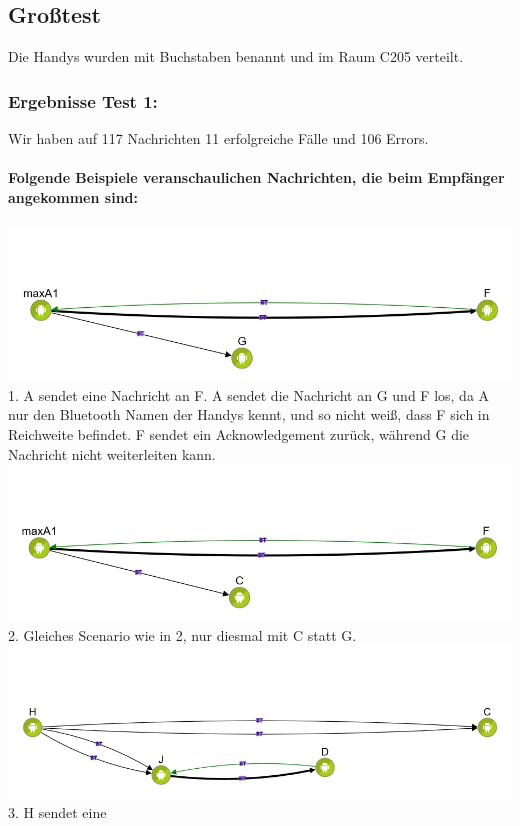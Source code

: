 \clearpage\subsection{Großtest}\label{grosstest-1}

Die Handys wurden mit Buchstaben benannt und im Raum C205 verteilt.

\subsubsection{Ergebnisse Test 1:}\label{ergebnisse-test-1}

Wir haben auf 117 Nachrichten 11 erfolgreiche Fälle und 106 Errors.
\\\\
\textbf{Folgende Beispiele veranschaulichen Nachrichten, die beim
Empfänger angekommen sind:}
\\\\
\includegraphics[width=1.0\textwidth]{belege/grosstests/Bilder/Erfolg4.jpg}\\
1. A sendet eine Nachricht an F. A sendet die Nachricht an G und F los, da A nur den
Bluetooth Namen der Handys kennt, und so nicht weiß, dass F sich in
Reichweite befindet. F sendet ein Acknowledgement zurück, während G die
Nachricht nicht weiterleiten kann.\\
\includegraphics[width=1.0\textwidth]{belege/grosstests/Bilder/Erfolg3.jpg}\\
2. Gleiches Scenario wie in 2, nur diesmal mit C statt G.\\
\includegraphics[width=1.0\textwidth]{belege/grosstests/Bilder/Erfolg2.jpg}\\ 3. H sendet eine
